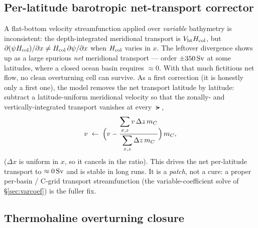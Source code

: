 \subsection{Per-latitude barotropic net-transport corrector}\label{sec:corrector}

A flat-bottom velocity streamfunction applied over \emph{variable} bathymetry is
inconsistent: the depth-integrated meridional transport is $V_{\mathrm{bt}}H_{\mathrm{col}}$,
but $\partial(\psi H_{\mathrm{col}})/\partial x \neq H_{\mathrm{col}}\,\partial\psi/\partial x$ when
$H_{\mathrm{col}}$ varies in $x$. The leftover divergence shows up as a large spurious
\emph{net} meridional transport --- order $\pm 350\,\mathrm{Sv}$ at some latitudes, where a
closed ocean basin requires $\approx 0$. With that much fictitious net flow, no
clean overturning cell can survive. As a first correction (it is honestly only a
first one), the model removes the net transport latitude by latitude: subtract a
latitude-uniform meridional velocity so that the zonally- and vertically-integrated
transport vanishes at every $\lat$,
\begin{equation}
  v \;\leftarrow\; \Big(v - \frac{\displaystyle\sum_{x,z}v\,\Delta z\,m_C}
                               {\displaystyle\sum_{x,z}\Delta z\,m_C}\Big)\,m_C ,
  \label{eq:corrector}
\end{equation}
($\Delta x$ is uniform in $x$, so it cancels in the ratio). This drives the net
per-latitude transport to $\approx 0\,\mathrm{Sv}$ and is stable in long runs. It is a
\emph{patch}, not a cure: a proper per-basin / C-grid transport streamfunction (the
variable-coefficient solve of \S\ref{sec:varcoef}) is the fuller fix.

\subsection{Thermohaline overturning closure}\label{sec:thc}

